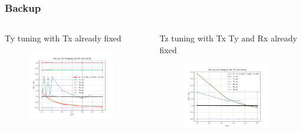 \documentclass[aspectratio=1610, 12pt]{beamer}
\begin{document}
\begin{frame}\frametitle{Backup}
  \begin{columns}
    \begin{column}[c]{0.48\textwidth}
      Ty tuning with Tx already fixed
      \begin{figure}
        \includegraphics[width=0.9\textwidth]{plots/retest/Ty_with_set_Tx_full_fit.pdf}
      \end{figure}
    \end{column}
    \begin{column}[c]{0.48\textwidth}
      Tz tuning with Tx Ty and Rx already fixed
      \begin{figure}
        \includegraphics[width=0.9\textwidth]{plots/retest/Tz_set_TxTzRx_full_fit.pdf}
      \end{figure}
    \end{column}
  \end{columns}
\end{frame}
\end{document}
